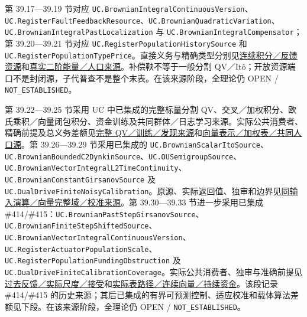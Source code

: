 \documentclass[
  11pt,
  oneside]{book}
\begin{document}
第 39.17---39.19 节对应 \nolinkurl{UC.BrownianIntegralContinuousVersion}、\nolinkurl{UC.RegisterFaultFeedbackResource}、\nolinkurl{UC.BrownianQuadraticVariation}、\nolinkurl{UC.BrownianIntegralPastLocalization} 与 \nolinkurl{UC.BrownianIntegralCompensator}；第 39.20---39.21 节对应 \nolinkurl{UC.RegisterPopulationHistorySource} 和 \nolinkurl{UC.RegisterPopulationTypePrice}。直接义务与精确类型分别见\href{../formalization/ueot-core/docs/compression/theory_completion/unified_closure/continuous_resource_source_v1/RESULTS_AND_OPEN_OBLIGATIONS.md}{连续积分／反馈资源}和\href{../formalization/ueot-core/docs/compression/theory_completion/unified_closure/compensator_population_source_v1/RESULTS_AND_OPEN_OBLIGATIONS.md}{真实二阶能量／人口来源}。补偿鞅不等于一般分割 QV／Itô；开放资源端口不是封闭源，子代普查不是整个末表。在该来源阶段，全理论仍 OPEN / \nolinkurl{NOT_ESTABLISHED}。

第 39.22---39.25 节采用 UC 中已集成的完整标量分割 QV、交叉／加权积分、欧氏乘积／向量闭包积分、资金训练及共同群体／日志学习来源。实际公共消费者、精确前提及总义务差额见\href{../formalization/ueot-core/docs/compression/theory_completion/unified_closure/full_qv_vector_training_source_v1/RESULTS_AND_OPEN_OBLIGATIONS.md}{完整 QV／训练／发现来源}和\href{../formalization/ueot-core/docs/compression/theory_completion/unified_closure/vector_weighted_population_source_v1/RESULTS_AND_OPEN_OBLIGATIONS.md}{向量表示／加权表／共同人口源}。第 39.26---39.29 节采用已集成的 \nolinkurl{UC.BrownianScalarItoSource}、\nolinkurl{UC.BrownianBoundedC2DynkinSource}、\nolinkurl{UC.OUSemigroupSource}、\nolinkurl{UC.BrownianVectorIntegralL2TimeContinuity}、\nolinkurl{UC.BrownianConstantGirsanovSource} 及 \nolinkurl{UC.DualDriveFiniteNoisyCalibration}。原源、实际返回值、独审和边界见\href{../formalization/ueot-core/docs/compression/theory_completion/unified_closure/ito_vector_calibration_source_v1/RESULTS_AND_OPEN_OBLIGATIONS.md}{同输入演算／向量完整域／校准来源}。第 39.30---39.33 节进一步采用已集成 \#414/\#415：\nolinkurl{UC.BrownianPastStepGirsanovSource}、\nolinkurl{UC.BrownianFiniteStepShiftedSource}、\nolinkurl{UC.BrownianVectorIntegralContinuousVersion}、\nolinkurl{UC.RegisterActuatorPopulationScale}、\nolinkurl{UC.RegisterPopulationFundingObstruction} 及 \nolinkurl{UC.DualDriveFiniteCalibrationCoverage}。实际公共消费者、独审与准确前提见\href{../formalization/ueot-core/docs/compression/theory_completion/unified_closure/past_feedback_scale_source_v1/RESULTS_AND_OPEN_OBLIGATIONS.md}{过去反馈／实际尺度／接受}和\href{../formalization/ueot-core/docs/compression/theory_completion/unified_closure/table_continuous_funding_source_v1/RESULTS_AND_OPEN_OBLIGATIONS.md}{实际表路径／连续向量／持续资金}。该段记录 \#414/\#415 的历史来源；其后已集成的有界可预测控制、适应校准和载体算法差额见下段。在该来源阶段，全理论仍 OPEN / \nolinkurl{NOT_ESTABLISHED}。
\end{document}
